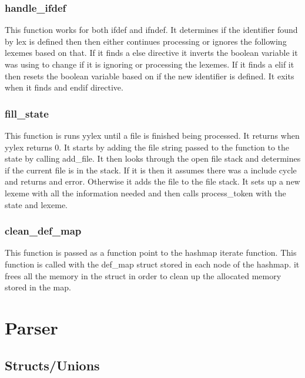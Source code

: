 \documentclass[11pt]{article}
\begin{document}
            \subsubsection{handle\_ifdef}
                This function works for both ifdef and ifndef. It determines if the identifier found by lex is defined
                then then either continues processing or ignores the following lexemes based on that. If it finds
                a else  directive it inverts the boolean variable it was using to change if it is ignoring or processing 
                the lexemes. If it finds a elif it then resets the boolean variable based on if the new identifier is defined.
                It exits when it finds and endif directive.

            \subsubsection{fill\_state}
                This function is runs yylex until a file is finished being processed. It returns when yylex returns 0. 
                It starts by adding the file string passed to the function to the state by calling add\_file.
                It then looks through the open file stack and determines if the current file is in the stack.
                If it is then it assumes there was a include cycle and returns and error. Otherwise it adds the file
                to the file stack.
                It sets up a new lexeme with all the information needed and then calls process\_token with the state and lexeme.

            \subsubsection{clean\_def\_map}
                This function is passed as a function point to the hashmap iterate function.
                This function is called with the def\_map struct stored in each node of the hashmap.
                it frees all the memory in the struct in order to clean up the allocated memory stored in the map.
    
    \section{Parser}
        
        \subsection{Structs/Unions}
\end{document}

